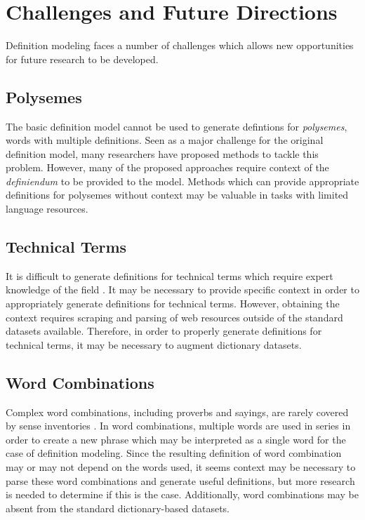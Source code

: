 \section{Challenges and Future Directions}
Definition modeling faces a number of challenges which allows new opportunities
for future research to be developed.

\subsection{Polysemes} The basic definition model cannot be used to generate
defintions for \textit{polysemes}, words with multiple definitions. Seen as a
major challenge for the original definition model, many researchers have
proposed methods to tackle this problem. However, many of the proposed
approaches require context of the \textit{definiendum} to be provided to the
model. Methods which can provide appropriate definitions for polysemes without
context may be valuable in tasks with limited language resources.

\subsection{Technical Terms} It is difficult to generate definitions for technical
terms which require expert knowledge of the field \cite{huang_cdm_2021}. It may
be necessary to provide specific context in order to appropriately generate
definitions for technical terms. However, obtaining the context requires
scraping and parsing of web resources outside of the standard datasets
available. Therefore, in order to properly generate definitions for technical
terms, it may be necessary to augment dictionary datasets.

\subsection{Word Combinations} Complex word combinations, including proverbs and
sayings, are rarely covered by sense inventories
\cite{bevilacqua_generationary_2020}. In word combinations, multiple words are
used in series in order to create a new phrase which may be interpreted as a
single word for the case of definition modeling. Since the resulting definition
of  word combination may or may not depend on the words used, it seems context
may be necessary to parse these word combinations and generate useful
definitions, but more research is needed to determine if this is the case.
Additionally, word combinations may be absent from the standard dictionary-based
datasets.

